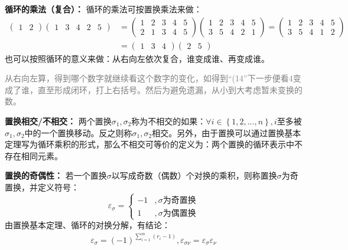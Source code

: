 \documentclass[zihao=-4,UTF8]{report}
\begin{document}
\textbf{循环的乘法（复合）：}
循环的乘法可按置换乘法来做：
\begin{align*}
\begin{pmatrix}
    1&2
\end{pmatrix}
\begin{pmatrix}
    1&3&4&2&5
\end{pmatrix}
&=\begin{pmatrix}
    1&2&3&4&5\\
    2&1&3&4&5
\end{pmatrix}
\begin{pmatrix}
    1&2&3&4&5\\
    3&5&4&2&1
\end{pmatrix}
=
\begin{pmatrix}
    1&2&3&4&5\\
    3&5&4&1&2
\end{pmatrix}\\
&=\begin{pmatrix}
    1&3&4
\end{pmatrix}
\begin{pmatrix}
    2&5
\end{pmatrix}
\end{align*}
也可以按照循环的意义来做：从右向左依次复合，谁变成谁、再变成谁。\par
\textcolor{gray}{从右向左算，得到哪个数字就继续看这个数字的变化，如得到“(14”下一步便看4变成了谁，直至形成闭环，打上右括号。然后为避免遗漏，从小到大考虑暂未变换的数。}

\textbf{置换相交/不相交：}
两个置换$\sigma_{1},\sigma_{2}$称为不相交的如果：$\forall i \in \left \{ 1,2,...,n \right \},i $至多被$\sigma_{1},\sigma_{2}$中的一个置换移动。反之则称$\sigma_{1},\sigma_{2}$相交。另外，由于置换可以通过置换基本定理写为循环乘积的形式，那么不相交可等价的定义为：两个置换的循环表示中不存在相同元素。

\textbf{置换的奇偶性：}
若一个置换$\sigma$以写成奇数（偶数）个对换的乘积，则称置换$\sigma$为奇置换，并定义符号：
\begin{equation*}
\varepsilon_{\sigma}=
\left\{\begin{matrix}
    -1&, \sigma \text{为奇置换}\\
    1&, \sigma \text{为偶置换}
\end{matrix}\right.
\end{equation*}
由置换基本定理、循环的对换分解，有结论：
\begin{align*}
    \varepsilon_{\sigma}=(-1)^{\sum_{i=1}^{m} (r_{i}-1)},\varepsilon_{\sigma \nu}=\varepsilon_{\sigma}\varepsilon_{\nu} 
\end{align*}
\end{document}
